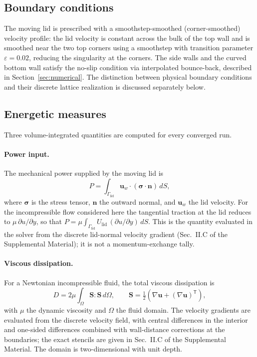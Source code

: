 \subsection{Boundary conditions}
\label{subsec:bc}

The moving lid is prescribed with a smoothstep-smoothed (corner-smoothed) velocity profile: the lid velocity is constant across the bulk of the top wall and is smoothed near the two top corners using a smoothstep with transition parameter $\varepsilon=0.02$, reducing the singularity at the corners. The side walls and the curved bottom wall satisfy the no-slip condition via interpolated bounce-back, described in Section~\ref{sec:numerical}. The distinction between physical boundary conditions and their discrete lattice realization is discussed separately below.

\subsection{Energetic measures}
\label{subsec:energetics}

Three volume-integrated quantities are computed for every converged run.

\paragraph{Power input.}
The mechanical power supplied by the moving lid is
\begin{equation}
P = \int_{\Gamma_{\mathrm{lid}}} \mathbf{u}_w \cdot (\boldsymbol{\sigma}\cdot\mathbf{n})\, dS,
\end{equation}
where $\boldsymbol{\sigma}$ is the stress tensor, $\mathbf{n}$ the outward normal, and $\mathbf{u}_w$ the lid velocity. For the incompressible flow considered here the tangential traction at the lid reduces to $\mu\,\partial u/\partial y$, so that $P=\mu\int_{\Gamma_{\mathrm{lid}}} U_{\mathrm{lid}}\,(\partial u/\partial y)\,dS$. This is the quantity evaluated in the solver from the discrete lid-normal velocity gradient (Sec.~II.C of the Supplemental Material); it is not a momentum-exchange tally.

\paragraph{Viscous dissipation.}
For a Newtonian incompressible fluid, the total viscous dissipation is
\begin{equation}
D = 2\mu \int_{\Omega} \mathbf{S}:\mathbf{S}\, d\Omega, \qquad
\mathbf{S} = \tfrac{1}{2}\left(\nabla\mathbf{u} + (\nabla\mathbf{u})^{\mathsf{T}}\right),
\end{equation}
with $\mu$ the dynamic viscosity and $\Omega$ the fluid domain. The velocity gradients are evaluated from the discrete velocity field, with central differences in the interior and one-sided differences combined with wall-distance corrections at the boundaries; the exact stencils are given in Sec.~II.C of the Supplemental Material. The domain is two-dimensional with unit depth.

